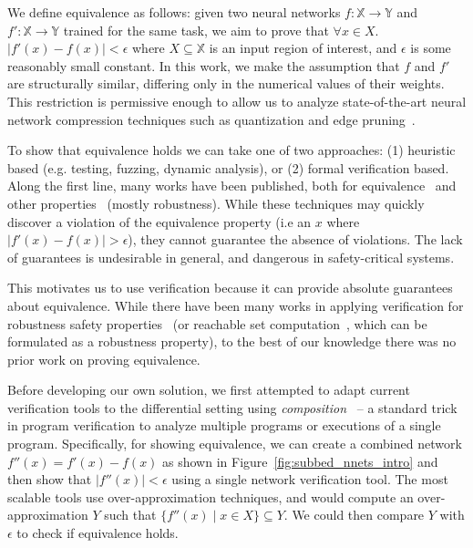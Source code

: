 We define equivalence as follows: given two neural networks $ f : \mathbb{X} \to
\mathbb{Y} $ and $ f' : \mathbb{X} \to \mathbb{Y} $ trained for the same task,
we aim to prove that $ \forall x \in X $. $ |f'(x) - f(x)| < \epsilon $ where $ X
\subseteq \mathbb{X} $ is an input region of interest, and $ \epsilon $ is some
reasonably small constant. In this work, we make the assumption that $ f $ and $
f' $ are structurally similar, differing only in the numerical values of their
weights. This restriction is permissive enough to allow us to analyze
state-of-the-art neural network compression techniques such as quantization and
edge pruning~\cite{HanMD16}.

To show that equivalence holds we can take one of two approaches: (1) heuristic
based (e.g. testing, fuzzing, dynamic analysis), or (2) formal verification
based. Along the first line, many works have been published, both for
equivalence~\cite{xie2019diffchaser,PeiCYJ17,MaLLZG18} and other
properties~\cite{ma2018deepgauge,xie2019deephunter,SunWRHKK18,TianPJR18,
odena2018tensorfuzz} (mostly robustness). While these techniques
may quickly discover a violation of the equivalence property (i.e an $ x $ where
$ |f'(x) - f(x)| > \epsilon $), they cannot guarantee the
absence of violations. The lack of guarantees is undesirable in general, and
dangerous in safety-critical systems.

This motivates us to use verification because it can provide absolute guarantees
about equivalence. While there have been many works in applying verification for
robustness safety properties~\cite{HuangKWW17,Ehlers17,KatzHIJLLSTWZDK19,RuanHK18,
WangPWYJ18nips,SinghGPV19iclr,MirmanGV18,GehrMDTCV18,FischerBDGZV19} (or reachable
set computation~\cite{hu2020reach,everett2021icra}, which can be
formulated as a robustness property), to the best of our knowledge there was no
prior work on proving equivalence.

Before developing our own solution, we first attempted to adapt current
verification tools to the differential setting using
\textit{composition}~\cite{barthe2011secure,terauchi2005secure,barthe2011relational}
 -- a standard trick in program verification to analyze multiple programs or
executions of a single program. Specifically, for showing equivalence, we can
create a combined network $ f''(x) = f'(x) - f(x) $ as shown in
Figure~\ref{fig:subbed_nnets_intro}
and then show that $ |f''(x)| < \epsilon $ using a single network verification
tool. The most scalable tools use over-approximation techniques, and would
compute an over-approximation $ Y $ such that $ \{f''(x) \; | \; x \in X \}
\subseteq Y $. We could then compare $ Y $ with $ \epsilon $ to check if
equivalence holds.

